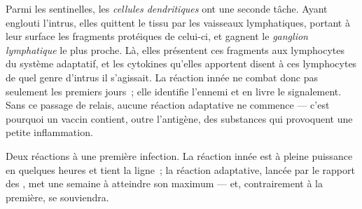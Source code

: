 \begin{proposition}\label{prop:g12:innate-immunity:handover}
Parmi les  sentinelles, les \emph{cellules
dendritiques} ont une seconde tâche. Ayant
englouti l'intrus, elles quittent le tissu par les vaisseaux
lymphatiques, portant à leur surface les fragments protéiques de
celui-ci, et gagnent le \emph{ganglion lymphatique} le plus proche.
Là, elles présentent ces fragments aux lymphocytes du système
adaptatif, et les cytokines qu'elles apportent disent à ces
lymphocytes de quel genre d'intrus il s'agissait. La réaction innée ne
combat donc pas seulement les premiers jours~; elle identifie l'ennemi
et en livre le signalement. Sans ce passage de relais, aucune réaction
adaptative ne commence --- c'est pourquoi un vaccin contient, outre
l'antigène, des substances qui provoquent une petite inflammation.
\end{proposition}
\admitted

\begin{omfigure}

{\small Deux réactions à une première infection. La réaction innée est
à pleine puissance en quelques heures et tient la ligne~; la réaction
adaptative, lancée par le rapport des , met une
semaine à atteindre son maximum --- et, contrairement à la première,
se souviendra.}
\end{omfigure}

